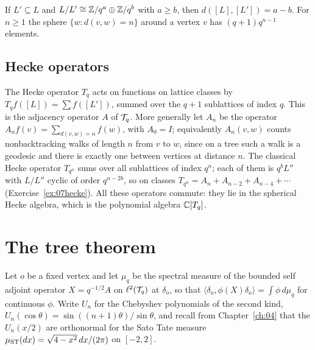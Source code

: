 If $L'\subseteq L$ and $L/L'\cong\mathbb{Z}/q^a\oplus\mathbb{Z}/q^b$ with $a\ge b$, then $d([L],[L'])=a-b$. For $n\ge1$ the sphere $\{w:d(v,w)=n\}$ around a vertex $v$ has $(q+1)q^{n-1}$ elements.

\subsection{Hecke operators}

The Hecke operator $T_q$ acts on functions on lattice classes by $T_qf([L])=\sum f([L'])$, summed over the $q+1$ sublattices of index $q$. This is the adjacency operator $A$ of $\mathcal{T}_q$. More generally let $A_n$ be the operator $A_nf(v)=\sum_{d(v,w)=n}f(w)$, with $A_0=I$; equivalently $A_n(v,w)$ counts nonbacktracking walks of length $n$ from $v$ to $w$, since on a tree such a walk is a geodesic and there is exactly one between vertices at distance $n$. The classical Hecke operator $T_{q^n}$ sums over all sublattices of index $q^n$; each of them is $q^bL''$ with $L/L''$ cyclic of order $q^{n-2b}$, so on classes $T_{q^n}=A_n+A_{n-2}+A_{n-4}+\cdots$ (Exercise~\ref{ex:07hecke}). All these operators commute: they lie in the spherical Hecke algebra, which is the polynomial algebra $\mathbb{C}[T_q]$.

\section{The tree theorem}

Let $o$ be a fixed vertex and let $\mu_q$ be the spectral measure of the bounded self adjoint operator $X=q^{-1/2}A$ on $\ell^2(\mathcal{T}_q)$ at $\delta_o$, so that $\langle\delta_o,\phi(X)\delta_o\rangle=\int\phi\,d\mu_q$ for continuous $\phi$. Write $U_n$ for the Chebyshev polynomials of the second kind, $U_n(\cos\theta)=\sin((n+1)\theta)/\sin\theta$, and recall from Chapter~\ref{ch:04} that the $U_n(x/2)$ are orthonormal for the Sato Tate measure $\mu_{\mathrm{ST}}(dx)=\sqrt{4-x^2}\,dx/(2\pi)$ on $[-2,2]$.

